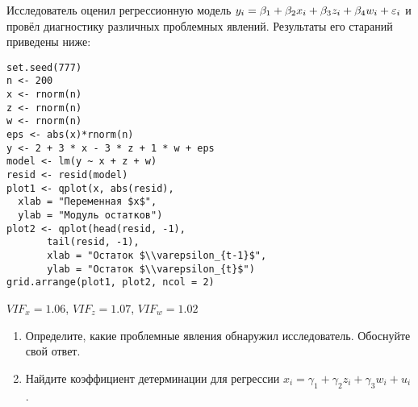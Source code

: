 \begin{problem}
Исследователь оценил регрессионную модель $y_i = \beta_1 + \beta_2 x_i + \beta_3 z_i + \beta_4 w_i + \e_i$ и провёл диагностику различных проблемных явлений. 
Результаты его стараний приведены ниже:



\begin{verbatim}
set.seed(777)
n <- 200
x <- rnorm(n)
z <- rnorm(n)
w <- rnorm(n)
eps <- abs(x)*rnorm(n)
y <- 2 + 3 * x - 3 * z + 1 * w + eps
model <- lm(y ~ x + z + w)
resid <- resid(model)
plot1 <- qplot(x, abs(resid),
  xlab = "Переменная $x$",
  ylab = "Модуль остатков")
plot2 <- qplot(head(resid, -1),
       tail(resid, -1),
       xlab = "Остаток $\\varepsilon_{t-1}$",
       ylab = "Остаток $\\varepsilon_{t}$")
grid.arrange(plot1, plot2, ncol = 2)
\end{verbatim}



\begin{minipage}{0.6\textwidth}
\begin{center}
\begin{tikzpicture}[scale = 0.025]

\end{tikzpicture}
\end{center}
\end{minipage}

$VIF_x = 1.06$, $VIF_z = 1.07$, $VIF_w = 1.02$
\begin{enumerate}
\item Определите, какие проблемные явления обнаружил исследователь. Обоснуйте свой ответ.
\item Найдите коэффициент детерминации для регрессии $x_{i} = \gamma_1 + \gamma_2 z_i + \gamma_3 w_i + u_i$.
\end{enumerate}



\begin{sol}
\end{sol}
\end{problem}



